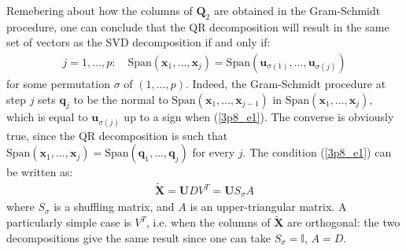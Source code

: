 Remebering about how the columns of $\mathbf{Q}_2$ are obtained in the Gram-Schmidt procedure, one can conclude that the QR decomposition will result in the same set of vectors as the SVD decomposition if and only if:
\begin{eqnarray} \label{3p8_e1}
j = 1, \ldots, p:\quad \textrm{Span}(\mathbf{x}_1, \ldots, \mathbf{x}_j) = \textrm{Span}(\mathbf{u}_{\sigma(1)}, \ldots, \mathbf{u}_{\sigma(j)})
\end{eqnarray}
for some permutation $\sigma$ of $(1, \ldots, p)$. Indeed, the Gram-Schmidt procedure at step $j$ 
sets $\mathbf{q}_j$ to be the normal to $\textrm{Span}(\mathbf{x}_1, \ldots, \mathbf{x}_{j - 1})$ in $\textrm{Span}(\mathbf{x}_1, \ldots, \mathbf{x}_{j})$, which is equal to $\mathbf{u}_{\sigma(j)}$ up to
a sign when (\ref{3p8_e1}). The converse is obviously true, since the QR decomposition is such that
$\textrm{Span}(\mathbf{x}_1, \ldots, \mathbf{x}_j) = \textrm{Span}(\mathbf{q}_1, \ldots, \mathbf{q}_j)$ for 
every $j$. The condition (\ref{3p8_e1}) can be written as:
\begin{eqnarray*}
\tilde{\mathbf{X}}= \mathbf{U} D V^T = \mathbf{U} S_\sigma A
\end{eqnarray*}
where $S_\sigma$ is a shuffling matrix, and $A$ is an upper-triangular matrix. A particularly simple case
is $V^T$, i.e. when the columns of $\tilde{\mathbf{X}}$ are orthogonal: the two decompositions give the 
same result since one can take $S_\sigma = \mathbb{I}$, $A = D$.

